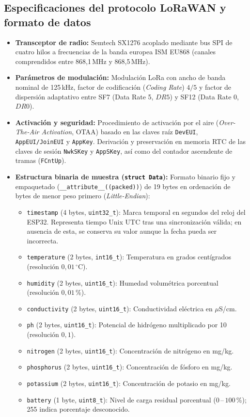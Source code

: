 \subsection{Especificaciones del protocolo LoRaWAN y formato de datos}
\begin{itemize}
    \item \textbf{Transceptor de radio:} Semtech SX1276 acoplado mediante bus SPI de cuatro hilos a frecuencias de la banda europea ISM EU868 (canales comprendidos entre 868,1\,MHz y 868,5\,MHz).
    \item \textbf{Parámetros de modulación:} Modulación LoRa con ancho de banda nominal de 125\,kHz, factor de codificación (\textit{Coding Rate}) $4/5$ y factor de dispersión adaptativo entre SF7 (Data Rate 5, $DR5$) y SF12 (Data Rate 0, $DR0$).
    \item \textbf{Activación y seguridad:} Procedimiento de activación por el aire (\textit{Over-The-Air Activation}, OTAA) basado en las claves raíz \texttt{DevEUI}, \texttt{AppEUI/JoinEUI} y \texttt{AppKey}. Derivación y preservación en memoria RTC de las claves de sesión \texttt{NwkSKey} y \texttt{AppSKey}, así como del contador ascendente de tramas (\texttt{FCntUp}).
    \item \textbf{Estructura binaria de muestra (\texttt{struct Data}):} Formato binario fijo y empaquetado (\texttt{\_\_attribute\_\_((packed))}) de 19 bytes en ordenación de bytes de menor peso primero (\textit{Little-Endian}):
    \begin{itemize}
        \item \texttt{timestamp} (4 bytes, \texttt{uint32\_t}): Marca temporal en segundos del reloj del ESP32. Representa tiempo Unix UTC tras una sincronización válida; en ausencia de esta, se conserva su valor aunque la fecha pueda ser incorrecta.
        \item \texttt{temperature} (2 bytes, \texttt{int16\_t}): Temperatura en grados centígrados (resolución $0{,}01$\,$^\circ$C).
        \item \texttt{humidity} (2 bytes, \texttt{uint16\_t}): Humedad volumétrica porcentual (resolución $0{,}01$\,\%).
        \item \texttt{conductivity} (2 bytes, \texttt{uint16\_t}): Conductividad eléctrica en $\mu$S/cm.
        \item \texttt{ph} (2 bytes, \texttt{uint16\_t}): Potencial de hidrógeno multiplicado por 10 (resolución $0{,}1$).
        \item \texttt{nitrogen} (2 bytes, \texttt{uint16\_t}): Concentración de nitrógeno en mg/kg.
        \item \texttt{phosphorus} (2 bytes, \texttt{uint16\_t}): Concentración de fósforo en mg/kg.
        \item \texttt{potassium} (2 bytes, \texttt{uint16\_t}): Concentración de potasio en mg/kg.
        \item \texttt{battery} (1 byte, \texttt{uint8\_t}): Nivel de carga residual porcentual ($0$\,--\,$100$\,\%); 255 indica porcentaje desconocido.
    \end{itemize}
\end{itemize}

